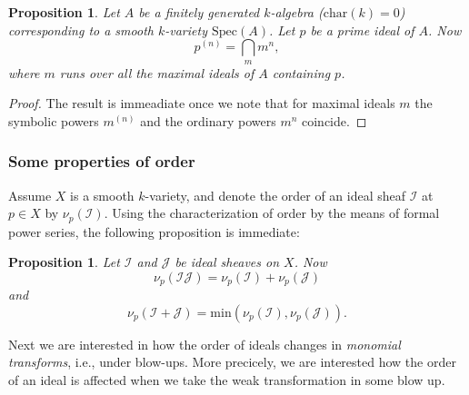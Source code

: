 \documentclass[12pt,a4paper,leqno]{article}
\newcommand{\spec}{\mathrm{Spec}}
\theoremstyle{plain}
\newtheorem{prop}[theo]{Proposition}
\theoremstyle{definition}
\theoremstyle{remark}
\begin{document}
\begin{prop}
Let $A$ be a finitely generated $k$-algebra ($\mathrm{char} (k) = 0$) corresponding to a smooth $k$-variety $\spec (A)$. Let $p$ be a prime ideal of $A$. Now
\begin{equation*}
p^{(n)} = \bigcap_m m^n,
\end{equation*}
where $m$ runs over all the maximal ideals of $A$ containing $p$.
\end{prop}
\begin{proof}
The result is immeadiate once we note that for maximal ideals $m$ the symbolic powers $m^{(n)}$ and the ordinary powers $m^n$ coincide.
\end{proof}

\subsubsection*{Some properties of order}

Assume $X$ is a smooth $k$-variety, and denote the order of an ideal sheaf $\mathscr{I}$ at $p \in X$ by $\nu_p (\mathscr{I})$. Using the characterization of order by the means of formal power series, the following proposition is immediate:
\begin{prop}
Let $\mathscr{I}$ and $\mathscr{J}$ be ideal sheaves on $X$. Now
\begin{equation*}
\nu_p (\mathscr{I} \mathscr{J}) = \nu_p (\mathscr{I}) +  \nu_p(\mathscr{J})
\end{equation*}
and
\begin{equation*}
\nu_p (\mathscr{I} + \mathscr{J}) = \mathrm{min} (\nu_p (\mathscr{I}),  \nu_p(\mathscr{J})).
\end{equation*}
\end{prop}

Next we are interested in how the order of ideals changes in \emph{monomial transforms}, i.e., under blow-ups. More precicely, we are interested how the order of an ideal is affected when we take the weak transformation in some blow up.
\end{document}
